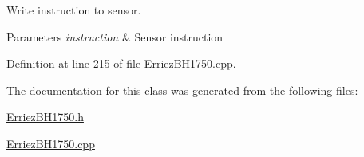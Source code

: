 Write instruction to sensor. 


\begin{DoxyParams}{Parameters}
{\em instruction} & Sensor instruction \\
\hline
\end{DoxyParams}


Definition at line 215 of file Erriez\+B\+H1750.\+cpp.



The documentation for this class was generated from the following files\+:\begin{DoxyCompactItemize}
\item 
\hyperlink{_erriez_b_h1750_8h}{Erriez\+B\+H1750.\+h}\item 
\hyperlink{_erriez_b_h1750_8cpp}{Erriez\+B\+H1750.\+cpp}\end{DoxyCompactItemize}
